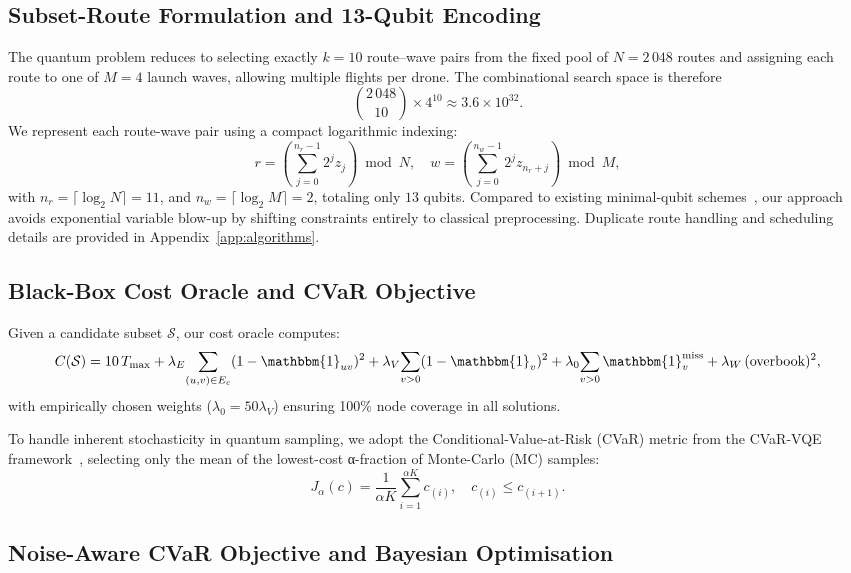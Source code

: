 \subsection{Subset-Route Formulation and 13-Qubit Encoding}

The quantum problem reduces to selecting exactly \(k=10\) route–wave pairs from the fixed pool of \(N=2\,048\) routes and assigning each route to one of \(M=4\) launch waves, allowing multiple flights per drone. The combinational search space is therefore
\[
{2\,048 \choose 10}\times4^{10}\approx3.6\times10^{32}.
\]
We represent each route-wave pair using a compact logarithmic indexing:
\[
r=\left(\sum_{j=0}^{n_r-1}2^{j} z_j\right)\!\bmod N,\quad
w=\left(\sum_{j=0}^{n_w-1}2^{j} z_{n_r+j}\right)\!\bmod M,
\]
with \(n_r=\lceil\log_2 N\rceil=11\), and \(n_w=\lceil\log_2 M\rceil=2\), totaling only \(13\) qubits. Compared to existing minimal-qubit schemes~\cite{davies_quantum_2024,leonidas_qubit_2023}, our approach avoids exponential variable blow-up by shifting constraints entirely to classical preprocessing. Duplicate route handling and scheduling details are provided in Appendix~\ref{app:algorithms}.

\subsection{Black-Box Cost Oracle and CVaR Objective}\label{sec:cost}

Given a candidate subset \(\mathcal{S}\), our cost oracle computes:
\[
C(\mathcal{S}) = 
10\,T_{\max} + 
\lambda_E\!\sum_{(u,v)\in E_c}(1-\mathbbm{1}_{uv})^{2} +
\lambda_V\!\sum_{v>0}(1-\mathbbm{1}_{v})^{2} +
\lambda_0\!\sum_{v>0}\mathbbm{1}_{v}^{\mathrm{miss}} +
\lambda_W\,(\text{overbook})^{2},
\]
with empirically chosen weights (\(\lambda_0=50\lambda_V\)) ensuring 100\% node coverage in all solutions.

To handle inherent stochasticity in quantum sampling, we adopt the Conditional-Value-at-Risk (CVaR) metric from the CVaR-VQE framework~\cite{barkoutsos2020cvar}, selecting only the mean of the lowest-cost α-fraction of Monte-Carlo (MC) samples:
\[
J_{\alpha}(c)=\frac{1}{\alpha K}\sum_{i=1}^{\alpha K} c_{(i)},\quad c_{(i)}\le c_{(i+1)}.
\]

\subsection{Noise-Aware CVaR Objective and Bayesian Optimisation}


